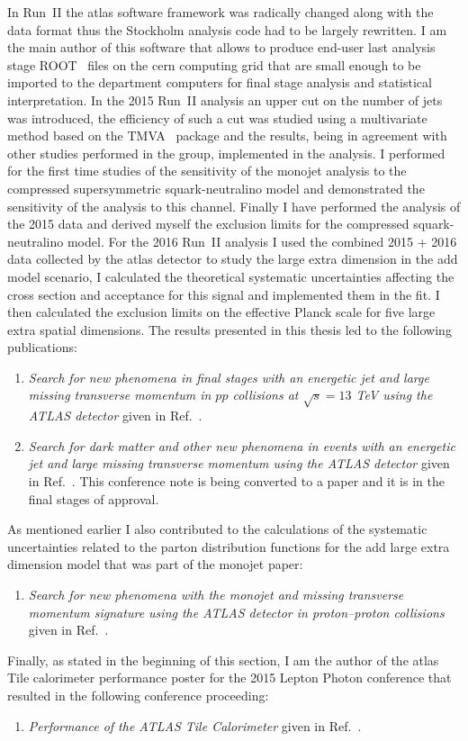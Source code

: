 In Run~II the \gls{atlas} software framework was radically changed along with
the data format thus the Stockholm analysis code had to be largely rewritten. I
am the main author of this software that allows to produce end-user last
analysis stage ROOT~\cite{CERNROOT} files on the \gls{cern} computing grid that
are small enough to be imported to the department computers for final stage
analysis and statistical interpretation. In the 2015 Run~II analysis an upper
cut on the number of jets was introduced, the efficiency of such a cut was
studied using a multivariate method based on the TMVA~\cite{TMVA} package and
the results, being in agreement with other studies performed in the group,
implemented in the analysis. I performed for the first time studies of the
sensitivity of the monojet analysis to the compressed supersymmetric
squark-neutralino model and demonstrated the sensitivity of the analysis to this
channel. Finally I have performed the analysis of the 2015 data and derived
myself the exclusion limits for the compressed squark-neutralino model. For the
2016 Run~II analysis I used the combined 2015 + 2016 data collected by the
\gls{atlas} detector to study the large extra dimension in the \gls{add} model
scenario, I calculated the theoretical systematic uncertainties affecting the
cross section and acceptance for this signal and implemented them in the fit. I
then calculated the exclusion limits on the effective Planck scale for five
large extra spatial dimensions. The results presented in this thesis led to the
following publications:
\begin{enumerate}[A -]
\item \emph{{Search for new phenomena in final stages with an energetic jet and
      large missing transverse momentum in $pp$ collisions at $\sqrt{s} = 13$
      TeV using the ATLAS detector}} given in Ref.~\cite{MonoJetPaper}.
\item \emph{{Search for dark matter and other new phenomena in events with an
      energetic jet and large missing transverse momentum using the ATLAS
      detector}} given in Ref.~\cite{MonoJetPaper2016}. This conference note is
  being converted to a paper and it is in the final stages of approval.
\end{enumerate}
As mentioned earlier I also contributed to the calculations of the systematic
uncertainties related to the parton distribution functions for the \gls{add}
large extra dimension model that was part of the monojet paper:
\begin{enumerate}[C -]
\item \emph{Search for new phenomena with the monojet and missing transverse
    momentum signature using the ATLAS detector in proton–proton
    collisions} given in Ref.~\cite{RunIPaper}.
\end{enumerate}
Finally, as stated in the beginning of this section, I am the author of the
\gls{atlas} Tile calorimeter performance poster for the 2015 Lepton Photon
conference that resulted in the following conference proceeding:
\begin{enumerate}[D -]
\item \emph{{Performance of the ATLAS Tile Calorimeter}} given in
  Ref.~\cite{TileCalPerformanceBertoli}.
\end{enumerate}

